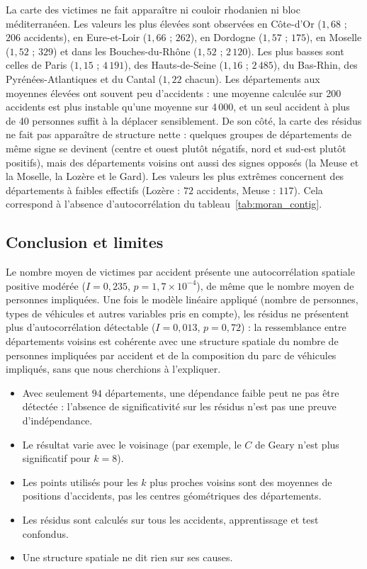 \documentclass[11pt,a4paper]{article}
\begin{document}
La carte des victimes ne fait apparaître ni couloir rhodanien ni bloc méditerranéen. Les valeurs les plus élevées sont observées en Côte-d'Or ($1{,}68$ ; $206$ accidents), en Eure-et-Loir ($1{,}66$ ; $262$), en Dordogne ($1{,}57$ ; $175$), en Moselle ($1{,}52$ ; $329$) et dans les Bouches-du-Rhône ($1{,}52$ ; $2\,120$). Les plus basses sont celles de Paris ($1{,}15$ ; $4\,191$), des Hauts-de-Seine ($1{,}16$ ; $2\,485$), du Bas-Rhin, des Pyrénées-Atlantiques et du Cantal ($1{,}22$ chacun). Les départements aux moyennes élevées ont souvent peu d'accidents : une moyenne calculée sur 200 accidents est plus instable qu'une moyenne sur 4\,000, et un seul accident à plus de 40 personnes suffit à la déplacer sensiblement. De son côté, la carte des résidus ne fait pas apparaître de structure nette : quelques groupes de départements de même signe se devinent (centre et ouest plutôt négatifs, nord et sud-est plutôt positifs), mais des départements voisins ont aussi des signes opposés (la Meuse et la Moselle, la Lozère et le Gard). Les valeurs les plus extrêmes concernent des départements à faibles effectifs (Lozère : $72$ accidents, Meuse : $117$). Cela correspond à l'absence d'autocorrélation du tableau~\ref{tab:moran_contig}.

\subsection{Conclusion et limites}
Le nombre moyen de victimes par accident présente une autocorrélation spatiale positive modérée ($I = 0{,}235$, $p = 1{,}7\times10^{-4}$), de même que le nombre moyen de personnes impliquées. Une fois le modèle linéaire appliqué (nombre de personnes, types de véhicules et autres variables pris en compte), les résidus ne présentent plus d'autocorrélation détectable ($I = 0{,}013$, $p = 0{,}72$) : la ressemblance entre départements voisins est cohérente avec une structure spatiale du nombre de personnes impliquées par accident et de la composition du parc de véhicules impliqués, sans que nous cherchions à l'expliquer.
\begin{itemize}
    \item Avec seulement $94$ départements, une dépendance faible peut ne pas être détectée : l'absence de significativité sur les résidus n'est pas une preuve d'indépendance.
    \item Le résultat varie avec le voisinage (par exemple, le $C$ de Geary n'est plus significatif pour $k = 8$).
    \item Les points utilisés pour les $k$ plus proches voisins sont des moyennes de positions d'accidents, pas les centres géométriques des départements.
    \item Les résidus sont calculés sur tous les accidents, apprentissage et test confondus.
    \item Une structure spatiale ne dit rien sur ses causes.
\end{itemize}
\end{document}
